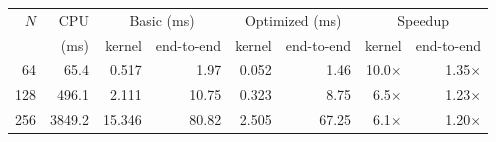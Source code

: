 \begin{tabular}{rrrrrrrr}
\toprule
$N$ & CPU & \multicolumn{2}{c}{Basic (ms)} & \multicolumn{2}{c}{Optimized (ms)} & \multicolumn{2}{c}{Speedup} \\
 & (ms) & kernel & end-to-end & kernel & end-to-end & kernel & end-to-end \\
\midrule
64 & 65.4 & 0.517 & 1.97 & 0.052 & 1.46 & 10.0$\times$ & 1.35$\times$ \\
128 & 496.1 & 2.111 & 10.75 & 0.323 & 8.75 & 6.5$\times$ & 1.23$\times$ \\
256 & 3849.2 & 15.346 & 80.82 & 2.505 & 67.25 & 6.1$\times$ & 1.20$\times$ \\
\bottomrule
\end{tabular}